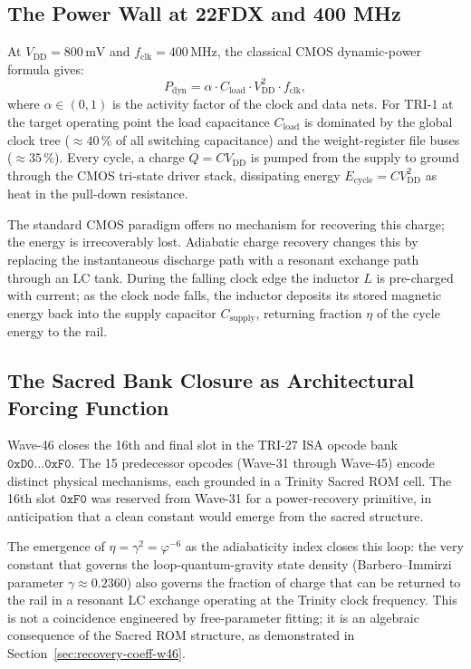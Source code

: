 \subsection{The Power Wall at 22FDX and 400 MHz}

At $V_{\mathrm{DD}} = 800\,\text{mV}$ and $f_{\mathrm{clk}} = 400\,\text{MHz}$,
the classical CMOS dynamic-power formula gives:
\begin{equation}\label{eq:classic-dynamic}
  P_{\mathrm{dyn}} = \alpha \cdot C_{\mathrm{load}} \cdot V_{\mathrm{DD}}^{2}
  \cdot f_{\mathrm{clk}},
\end{equation}
where $\alpha \in (0,1)$ is the activity factor of the clock and data nets.
For TRI-1 at the target operating point the load capacitance $C_{\mathrm{load}}$
is dominated by the global clock tree ($\approx 40\,\%$ of all switching
capacitance) and the weight-register file buses ($\approx 35\,\%$).
Every cycle, a charge $Q = C V_{\mathrm{DD}}$ is pumped from the supply to
ground through the CMOS tri-state driver stack, dissipating energy
$E_{\mathrm{cycle}} = C V_{\mathrm{DD}}^{2}$ as heat in the pull-down
resistance.

The standard CMOS paradigm offers no mechanism for recovering this charge; the
energy is irrecoverably lost.
Adiabatic charge recovery changes this by replacing the instantaneous
discharge path with a resonant exchange path through an LC tank.
During the falling clock edge the inductor $L$ is pre-charged with current;
as the clock node falls, the inductor deposits its stored magnetic energy
back into the supply capacitor $C_{\mathrm{supply}}$, returning fraction $\eta$
of the cycle energy to the rail.

\subsection{The Sacred Bank Closure as Architectural Forcing Function}

Wave-46 closes the 16th and final slot in the TRI-27 ISA opcode bank
$\texttt{0xD0}\ldots\texttt{0xF0}$.
The 15 predecessor opcodes (Wave-31 through Wave-45) encode distinct physical
mechanisms, each grounded in a Trinity Sacred ROM cell.
The 16th slot $\texttt{0xF0}$ was reserved from Wave-31 for a power-recovery
primitive, in anticipation that a clean constant would emerge from the sacred
structure.

The emergence of $\eta = \gamma^{2} = \varphi^{-6}$ as the adiabaticity index
closes this loop: the very constant that governs the loop-quantum-gravity state
density (Barbero--Immirzi parameter $\gamma \approx 0.2360$) also governs the
fraction of charge that can be returned to the rail in a resonant LC exchange
operating at the Trinity clock frequency.
This is not a coincidence engineered by free-parameter fitting; it is an
algebraic consequence of the Sacred ROM structure, as demonstrated in
Section~\ref{sec:recovery-coeff-w46}.

